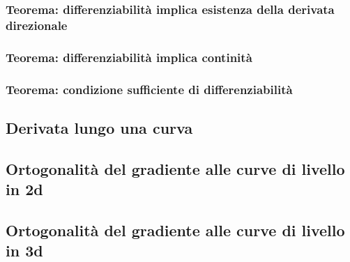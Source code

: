 \documentclass[x11names]{article}
\begin{document}
		\begin{center}
		\colorbox{myred}{\begin{minipage}{5.75in}
			\begin{redes}{}
			\subsubsection{Teorema: differenziabilità implica esistenza della derivata direzionale}
			\end{redes}
		\end{minipage}}        
		\end{center}

		\begin{center}
		\colorbox{myred}{\begin{minipage}{5.75in}
			\begin{redes}{}
			\subsubsection{Teorema: differenziabilità implica continità}
			\end{redes}
		\end{minipage}}        
		\end{center}

		\begin{center}
		\colorbox{myred}{\begin{minipage}{5.75in}
			\begin{redes}{}
			\subsubsection{Teorema: condizione sufficiente di differenziabilità}
			\end{redes}
		\end{minipage}}        
		\end{center}
	
	\subsection{Derivata lungo una curva}
	\subsection{Ortogonalità del gradiente alle curve di livello in 2d}
	\subsection{Ortogonalità del gradiente alle curve di livello in 3d}
\end{document}
